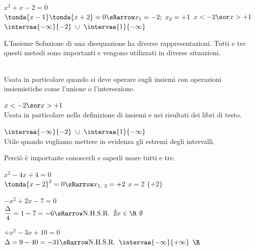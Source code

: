 {\(x^2+x-2 = 0\) \\ 
\(\tonda{x-1}\tonda{x+2} = 0 \sRarrow x_1 = -2;~x_2 = +1\)}
{
                  {}}
{
       {\(x<-2 \sor x>+1\)}
       {\(\intervaa{-\infty}{-2}~\cup~\intervaa{1}{-\infty}\)}}

\begin{osservazione}{}{}
L'Insieme Soluzione di una disequazione ha diverse rappresentazioni. 
Tutti e tre questi metodi sono importanti e vengono utilizzati in diverse 
situazioni.
\begin{description}[nosep]
\item [Forma Grafica:] \quad 
{}\\
Usata in particolare quando si deve operare sugli insiemi con 
operazioni insiemistiche come l'unione o l'intersezione.
\item [Con operatori relazionali:] \quad
\(x<-2 \sor x>+1\)\\
Usata in particolare nella definizione di insiemi e nei risultati dei 
libri di testo.
\item [Con le parentesi:] \quad 
\(\intervaa{-\infty}{-2}~\cup~\intervaa{1}{-\infty}\)\\
Utile quando vogliamo mettere in evidenza gli estremi degli intervalli.
\end{description}
\medskip
Perciò è importante conoscerli e saperli usare tutti e tre.
\end{osservazione}

{\(x^2-4x+4 = 0\) \\ 
\(\tonda{x-2}^2 = 0 \sRarrow x_{1,~2} = +2\)}
{
                   {}}
{
        {\(x=2\)}
        {\(\lbrace +2 \rbrace\)}}

{\(-x^2+2x-7 = 0\) \\ 
\(\dfrac{\Delta}{4}= 1 -7 = -6 \sRarrow \text{N.H.S.R.}\)}
{
  {\segniparadi}}
{
  {\(\nexists x \in \R\)}
  {\(\emptyset\)}}

{\(+x^2-3x+10 = 0\) \\ 
\(\Delta = 9 -40 = -31 \sRarrow \text{N.H.S.R.}\)}
{
  {\segniparaui}}
{
  {\(\intervaa{-\infty}{+\infty}\)}
  {\(\R\)}}

